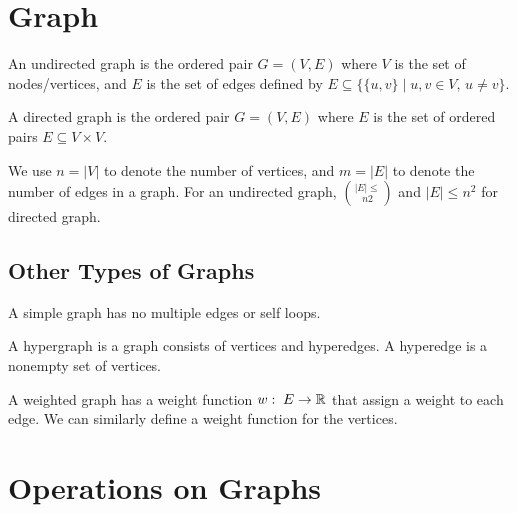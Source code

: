 \section{Graph}

\vspace{\parskip}

\begin{definition} 
    An undirected graph is the ordered pair $G=(V,E)$ where $V$ is the set of nodes/vertices, and $E$ is the set of edges defined by $E \subseteq \{ \{u,v\} \mid u,v \in V,\, u \neq v \}$.
\end{definition}

\begin{definition} 
    A directed graph is the ordered pair $G=(V,E)$ where $E$ is the set of ordered pairs $E \subseteq V \times V$.
\end{definition}

We use $n = |V|$ to denote the number of vertices, and $m = |E|$ to denote the number of edges in a graph. For an undirected graph, $|E| \leq \choose{n 2}$ and $|E| \leq n^2$ for directed graph. 

\subsection{Other Types of Graphs}   

A simple graph has no multiple edges or self loops.

A hypergraph is a graph consists of vertices and hyperedges. A hyperedge is a nonempty set of vertices.

A weighted graph has a weight function $w:\; E \to \mathbb{R}$ that assign a weight to each edge. We can similarly define a weight function for the vertices.

\section{Operations on Graphs}

